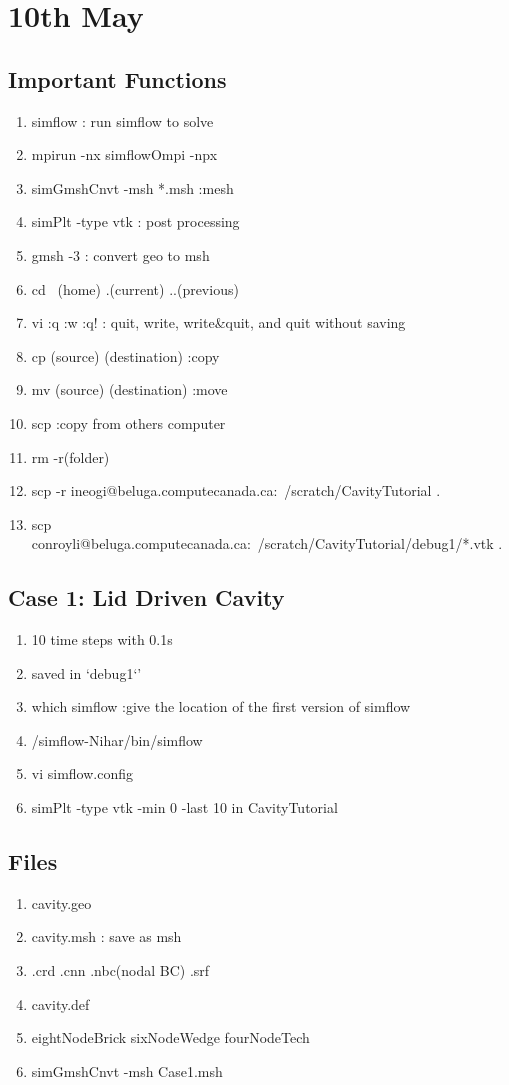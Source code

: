 \documentclass[12pt]{article} %
\begin{document}
\section{10th May}
\subsection{Important Functions}
\begin{enumerate}
    \item simflow : run simflow to solve
    \item mpirun -nx simflowOmpi -npx
    \item simGmshCnvt -msh *.msh :mesh
    \item simPlt -type vtk : post processing
    \item gmsh -3 : convert geo to msh
    \item cd ~(home) .(current) ..(previous)
    \item vi :q :w :q! : quit, write, write\&quit, and quit without saving
    \item cp (source) (destination) :copy
    \item mv (source) (destination) :move
    \item scp :copy from others computer
    \item rm -r(folder)
    \item scp -r ineogi@beluga.computecanada.ca:~/scratch/CavityTutorial .
    \item scp conroyli@beluga.computecanada.ca:~/scratch/CavityTutorial/debug1/*.vtk .
\end{enumerate}
\subsection{Case 1: Lid Driven Cavity}
\begin{enumerate}
    \item 10 time steps with 0.1s
    \item saved in `debug1`'
    \item which simflow :give the location of the first version of simflow
    \item /simflow-Nihar/bin/simflow
    \item vi simflow.config
    \item simPlt -type vtk -min 0 -last 10 in CavityTutorial
\end{enumerate}
    \subsection{Files}
    \begin{enumerate} 
        \item cavity.geo
        \item cavity.msh : save as msh
        \item .crd .cnn .nbc(nodal BC) .srf
        \item cavity.def
        \item eightNodeBrick sixNodeWedge fourNodeTech
        \item simGmshCnvt -msh Case1.msh
\end{enumerate}
\end{document}
